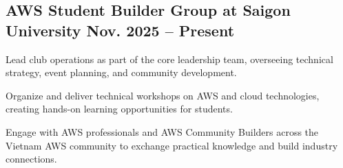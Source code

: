 \subsection{{AWS Student Builder Group at Saigon University \texorpdfstring{\hfill}{} Nov. 2025 -- Present}}
\begin{zitemize}
    \item Lead club operations as part of the core leadership team, overseeing technical strategy, event planning, and community development.

    \item Organize and deliver technical workshops on AWS and cloud technologies, creating hands-on learning opportunities for students.

    \item Engage with AWS professionals and AWS Community Builders across the Vietnam AWS community to exchange practical knowledge and build industry connections.
\end{zitemize}

